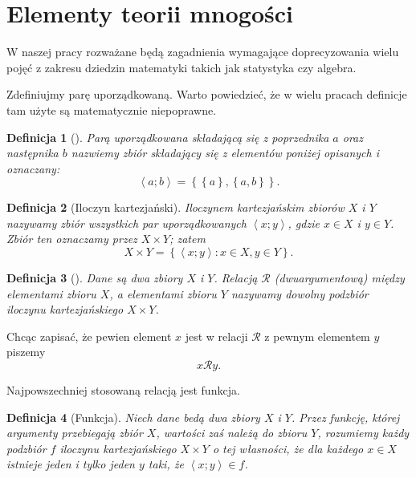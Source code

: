 \documentclass[12pt,a4paper]{report}
\newtheorem{definition}{Definicja}[chapter]
\newcommand{\parauporzadkowana}[2]{\left\langle {#1}; {#2} \right\rangle}
\newcommand{\zbior}[1]{\left\lbrace {#1} \right\rbrace }
\begin{document}
\section{Elementy teorii mnogości}
W naszej pracy rozważane będą zagadnienia wymagające doprecyzowania wielu pojęć z zakresu dziedzin matematyki takich jak statystyka czy algebra. 


Zdefiniujmy parę uporządkowaną. Warto powiedzieć, że w wielu pracach definicje tam użyte są matematycznie niepoprawne.

\begin{definition}[{\citep[Sec 3.3]{kuratowski1966wstkep}}]
Parą uporządkowana składającą się z poprzednika $a$ oraz następnika $b$ nazwiemy zbiór składający się z elementów poniżej opisanych i oznaczany:
\begin{equation*}
\parauporzadkowana{a}{b}=\zbior{\zbior{a}, \zbior{a,b}}.
\end{equation*}

\end{definition}

\begin{definition}[Iloczyn kartezjański{\citep[Sec 3.4]{kuratowski1966wstkep}}]
Iloczynem kartezjańskim zbiorów $X$ i $Y$ nazywamy zbiór wszystkich par uporządkowanych $\parauporzadkowana{x}{y}$, gdzie $x \in X$ i $y \in Y$. Zbiór ten oznaczamy przez $ X \times Y$; zatem
\begin{equation*}
X \times Y= \zbior{\parauporzadkowana{x}{y}:  x\in X  , y \in Y}.
\end{equation*} 

\end{definition}

\begin{definition}[{\citep[Sec 6.1 Def. 6.1]{kraszewski2007wstkep}}]
Dane są dwa zbiory $X$ i $Y$. Relacją $\mathcal{R}$ (dwuargumentową) między elementami zbioru $X$, a elementami zbioru $Y$ nazywamy dowolny podzbiór iloczynu kartezjańskiego $X \times Y$.
\end{definition}
Chcąc zapisać, że pewien element $x$ jest w relacji $\mathcal{R}$ z pewnym elementem $y$ piszemy
$$
x\mathcal{R}y.
$$

Najpowszechniej stosowaną relacją jest funkcja.

\begin{definition}[Funkcja{\citep[Sec 4.1]{kuratowski1966wstkep}}]
Niech dane bedą dwa zbiory $X$ i $Y$. Przez funkcję, której argumenty przebiegają zbiór $X$, wartości zaś należą do zbioru $Y$, rozumiemy każdy podzbiór $f$ iloczynu kartezjańskiego $X \times Y$ o tej własności, że dla każdego $x \in X$ istnieje jeden i tylko jeden $y$ taki, że $\parauporzadkowana{x}{y} \in f$. 

\end{definition}
\end{document}
